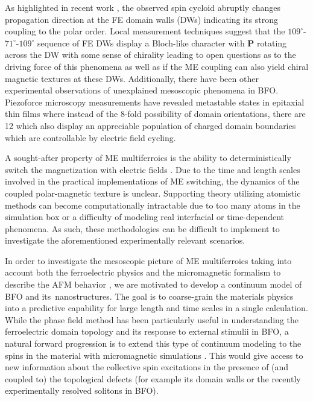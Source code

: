 \documentclass[%
 reprint,
superscriptaddress,
 amsmath,amssymb,
prb,
]{revtex4-1}
\begin{document}
%
As highlighted in recent work \cite{Gross2017,Chauleau2019}, the observed spin cycloid abruptly changes propagation direction at the FE domain walls (DWs) indicating its strong coupling to the polar order.
%
%
Local measurement techniques suggest that the $109^\circ$-$71^\circ$-$109^\circ$ sequence of FE DWs display a Bloch-like character with $\mathbf{P}$ rotating across the DW with some sense of chirality \cite{Chauleau2019, Fusil2022} leading to open questions as to the driving force of this phenomena as well as if the ME coupling can also yield chiral magnetic textures at these DWs. 
%
Additionally, there have been other experimental observations of  unexplained mesoscopic phenomena in BFO.
%
Piezoforce microscopy measurements have revealed metastable states in epitaxial thin films where instead of the 8-fold possibility of domain orientations, there are 12 which also display an appreciable population of charged domain boundaries which are controllable by electric field cycling\cite{Park2013}.
%

%
A sought-after property of ME multiferroics is the ability to deterministically switch the magnetization with electric fields \cite{Heron2014}.
%
Due to the time and length scales involved in the practical implementations of ME switching, the dynamics of the coupled polar-magnetic texture is unclear.
%
Supporting theory utilizing atomistic methods can become computationally intractable due to too many atoms in the simulation box or a difficulty of modeling real interfacial or time-dependent phenomena.
%
As such, these methodologies can be difficult to implement to investigate the aforementioned experimentally relevant scenarios.
%

%
In order to investigate the mesoscopic picture of ME multiferroics taking into account both the ferroelectric physics and the micromagnetic formalism to describe the AFM behavior \cite{Ivanov2005}, we are motivated to develop a continuum model of BFO and its nanostructures.
%
The goal is to coarse-grain the materials physics into a predictive capability for large length and time scales in a single calculation.
%
While the phase field method has been particularly useful in understanding the ferroelectric domain topology and its response to external stimulii in BFO\cite{Chen2008, Xue2021}, a natural forward progression is to extend this type of continuum modeling to the spins in the material with micromagnetic simulations \cite{Liao2020a, Liao2020b}.
%
This would give access to new information about the collective spin excitations in the presence of (and coupled to) the topological defects (for example its domain walls or the recently experimentally resolved solitons \cite{Govinden2022} in BFO).
%
\end{document}
